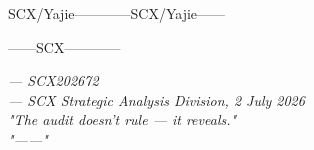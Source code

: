 \documentclass[12pt,a4paper]{article}
\theoremstyle{remark}
\begin{document}
\bigskip

\noindent\textbf{}\textbf{}SCX/Yajie————SCX/Yajie——

——SCX————

\vspace{1cm}
\begin{flushright}
    \textit{— SCX202672}\\
    \textit{— SCX Strategic Analysis Division, 2 July 2026}\\
    \textit{"The audit doesn't rule — it reveals."}\\
    \textit{"——"}
\end{flushright}

\end{document}
